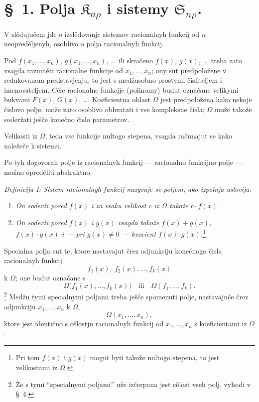 \documentclass[11pt]{article}
\providecommand{\Kfield}{\mathfrak{K}}
\providecommand{\Ssys}{\mathfrak{S}}
\begin{document}
\section*{\S\ 1. Polja $\Kfield_{n\rho}$ i sistemy $\Ssys_{n\rho}$.}

V slědujučem jde o izslědovanje sistemov racionalnyh funkcij od $n$ neopreděljenyh, osoblivo o polja racionalnyh funkcij.

Pod $f(x_1,\ldots,x_n)$, $g(x_1,\ldots,x_n)$, \ldots\ ili skračeno $f(x)$, $g(x)$, \ldots\ treba zato vsagda razuměti racionalne funkcije od $x_1,\ldots,x_n$; ony sut predpoložene v redukovanom predstavjenju, to jest s medžusobno prostymi čisliteljem i imenovateljem. Cěle racionalne funkcije (polinomy) budut označane velikymi bukvami $F(x)$, $G(x)$, \ldots. Koeficientna oblast $\Omega$ jest predpoložena kako nekoje čislovo polje, može zato osoblivo obhvatati i vse kompleksne čisla; $\Omega$ može takože soderžati ješče konečno čislo parametrov.

Velikosti iz $\Omega$, teda vse funkcije nultogo stepena, vsagda računajut se kako naležeče k sistemu.

Po tyh dogovorah polje iz racionalnyh funkcij --- racionalno funkcijno polje --- možno opreděliti abstraktno.

{\itshape Definicija I: Sistem racionalnyh funkcij nazyvaje se poljem, ako izpolnja uslovija:}
\begin{enumerate}
\item {\itshape On soderži pored $f(x)$ i za vsaku velikost $c$ iz $\Omega$ takože $c\cdot f(x)$.}
\item {\itshape On soderži pored $f(x)$ i $g(x)$ vsagda takože $f(x)+g(x)$, $f(x)\cdot g(x)$ i --- pri $g(x)\ne0$ --- kvocient $f(x):g(x)$.}\footnote{Pri tom $f(x)$ i $g(x)$ mogut byti takože nultogo stepena, to jest velikostami iz $\Omega$.}
\end{enumerate}
Specialna polja sut te, ktore nastavajut črez adjunkciju konečnogo čisla racionalnyh funkcij
\[
  f_1(x),\ f_2(x),\ldots, f_k(x)
\]
k $\Omega$; one budut označane s
\[
  \Omega\bigl(f_1(x),\ldots,f_k(x)\bigr)
  \quad\text{ili}\quad
  \Omega(f_1,\ldots,f_k).
\]
\footnote{Že s tymi ``specialnymi poljami'' uže izčerpana jest cělost vseh polj, vyhodi v \S\ 4.}
Medžu tymi specialnymi poljami treba ješče spomenuti polje, nastavajuče črez adjunkciju $x_1,\ldots,x_n$ k $\Omega$,
\[
  \Omega(x_1,\ldots,x_n),
\]
ktore jest identično s cělostju racionalnyh funkcij od $x_1,\ldots,x_n$ s koeficientami iz $\Omega$.
\end{document}

